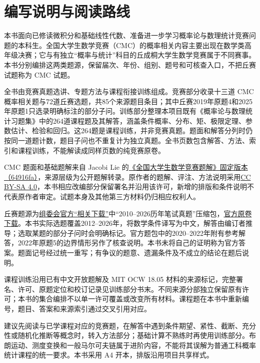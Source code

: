 \chapter*{编写说明与阅读路线}
本书面向已修读微积分和基础线性代数、准备进一步学习概率论与数理统计竞赛问题的本科生。全国大学生数学竞赛（CMC）的概率相关内容主要出现在数学类高年级决赛；它与有独立“概率与统计”科目的丘成桐大学生数学竞赛属于不同赛事。本书分别编排这两类题源，保留届次、年份、组别、题号和可核查入口，不把丘赛试题称为 CMC 试题。

全书由竞赛真题选讲、专题方法与课程衔接训练组成。竞赛部分收录十三道 CMC 概率相关题与72道丘赛选题，共85个来源题目条目；其中丘赛2019年原题4和2025年原题1只选录明确标注的部分子问。训练部分整理本项目既有《概率论与数理统计习题集》中的264道课程题及其解答，涵盖条件概率、分布、矩、极限定理、参数估计、检验和回归。这264题是课程训练，并非竞赛真题。题面和解答分列时仍按同一道题计数，题目子问也不重复计为独立真题。全书页数包含解答、方法、索引和课程训练，不能解读成同样页数的纯竞赛原卷。

CMC 题面和基础题解来自 Jacobi Lie 的\href{https://github.com/lzxcr/cmc-mathematics/tree/64916fa1fdbc3e444a652eca204d5669058ee321}{《全国大学生数学竞赛题解》固定版本（64916fa）}，来源层级为公开题解转录。原作者的题解、评注、方法说明采用\href{https://creativecommons.org/licenses/by-sa/4.0/}{CC BY-SA 4.0}，本书相应改编部分保留署名并沿用该许可，新增的排版和条件说明不代表原作者审定。试题本身及其他第三方材料仍归相应权利人。

丘赛题源为\href{https://yau-contest.com/lists-jxxg.html}{组委会官方“相关下载”}中“2010--2026历年笔试真题”压缩包，\href{https://yau-contest.com/index/reldown?id=9}{官方原卷下载}。本书实际选题覆盖2012--2026年，将数学条件译写为中文，解答由编订者推导；选取某题的部分子问时会明确标记。官方题包中的2020--2022年附有参考解答，2022年原题5的边界情形另作了核查说明。本书未将自己的证明称为官方答案。题面记号经过统一重写；有争议的题意、遗漏条件及不成立的结论在题后说明。

课程训练沿用已有中文开放题解及 MIT OCW 18.05 材料的来源标记，完整署名、许可、原题定位和校订记录见训练部分书末。不同来源分部独立保留原有许可；本书的集合编排不以单一许可覆盖或改变所有材料。课程题在本书中重新编号，题目、答案和来源索引通过交叉引用对应。

建议先阅读与已学课程对应的竞赛题，在解答中遇到条件期望、紧性、截断、充分性或随机化推断等概念时，转入方法部分；基础计算不熟练时再使用训练部分。布朗运动、测度变换和一般马尔可夫链属于进阶内容，不能将其误解为普通工科概率统计课程的统一要求。本书采用 A4 开本，排版沿用项目共享样式。

